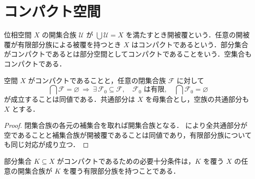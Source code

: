 \section{コンパクト空間}
\begin{defn}[コンパクト空間]
位相空間 $X$ の開集合族 $\mathcal U$ が $\bigcup\mathcal U=X$ を満たすとき開被覆という．任意の開被覆が有限部分族による被覆を持つとき $X$ はコンパクトであるという．部分集合がコンパクトであるとは部分空間としてコンパクトであることをいう．空集合もコンパクトである．
\end{defn}
\begin{prop}[有限交叉性によるコンパクト性の判定]
空間 $X$ がコンパクトであることと，任意の閉集合族 $\mathcal F$ に対して
\[
 \bigcap\mathcal F=\varnothing
 \ \Longrightarrow\
 \exists\,\mathcal F_0\subseteq\mathcal F,\quad
 \mathcal F_0\text{ は有限},\quad \bigcap\mathcal F_0=\varnothing
\]
が成立することは同値である．共通部分は $X$ を母集合とし，空族の共通部分も $X$ とする．
\end{prop}
\begin{proof}
閉集合族の各元の補集合を取れば開集合族となる． により全共通部分が空であることと補集合族が開被覆であることは同値であり，有限部分族についても同じ対応が成り立つ．
\end{proof}
\begin{prop}[コンパクト部分集合の被覆判定]
部分集合 $K\subseteq X$ がコンパクトであるための必要十分条件は，$K$ を覆う $X$ の任意の開集合族が $K$ を覆う有限部分族を持つことである．
\end{prop}
